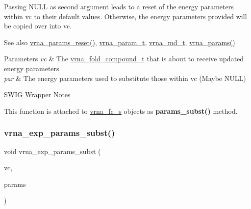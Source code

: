 Passing N\+U\+LL as second argument leads to a reset of the energy parameters within vc to their default values. Otherwise, the energy parameters provided will be copied over into vc.

\begin{DoxySeeAlso}{See also}
\hyperlink{group__energy__parameters_gac40dc82e48a72a97cfc58b9da08a7792}{vrna\+\_\+params\+\_\+reset()}, \hyperlink{group__energy__parameters_ga8a69ca7d787e4fd6079914f5343a1f35}{vrna\+\_\+param\+\_\+t}, \hyperlink{group__model__details_ga1f8a10e12a0a1915f2a4eff0b28ea17c}{vrna\+\_\+md\+\_\+t}, \hyperlink{group__energy__parameters_gad0e3e7e74bdc50d1709d40c92993185e}{vrna\+\_\+params()}
\end{DoxySeeAlso}

\begin{DoxyParams}{Parameters}
{\em vc} & The \hyperlink{group__fold__compound_ga1b0cef17fd40466cef5968eaeeff6166}{vrna\+\_\+fold\+\_\+compound\+\_\+t} that is about to receive updated energy parameters \\
\hline
{\em par} & The energy parameters used to substitute those within vc (Maybe N\+U\+LL)\\
\hline
\end{DoxyParams}
\begin{DoxyRefDesc}{S\+W\+I\+G Wrapper Notes}
\item[\hyperlink{wrappers__wrappers000050}{S\+W\+I\+G Wrapper Notes}]This function is attached to \hyperlink{group__fold__compound_structvrna__fc__s}{vrna\+\_\+fc\+\_\+s} objects as {\bfseries params\+\_\+subst()} method. \end{DoxyRefDesc}
\mbox{\label{group__energy__parameters_ga8e7ac4fab3b0cc03afbc134eaafb3525}} 
\subsubsection{\texorpdfstring{vrna\+\_\+exp\+\_\+params\+\_\+subst()}{vrna\_exp\_params\_subst()}}
{\footnotesize\ttfamily void vrna\+\_\+exp\+\_\+params\+\_\+subst (\begin{DoxyParamCaption}\item[{\hyperlink{group__fold__compound_ga1b0cef17fd40466cef5968eaeeff6166}{vrna\+\_\+fold\+\_\+compound\+\_\+t} $\ast$}]{vc,  }\item[{\hyperlink{group__energy__parameters_ga01d8b92fe734df8d79a6169482c7d8d8}{vrna\+\_\+exp\+\_\+param\+\_\+t} $\ast$}]{params }\end{DoxyParamCaption})}



